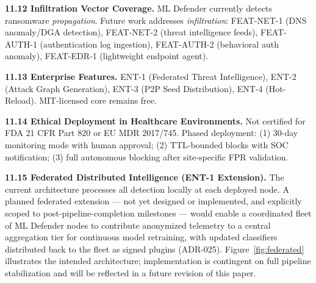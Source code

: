 \documentclass[11pt,a4paper]{article}
\begin{document}
    \textbf{11.12 Infiltration Vector Coverage.}
    ML Defender currently detects ransomware \emph{propagation}. Future work addresses
    \emph{infiltration}: FEAT-NET-1 (DNS anomaly/DGA detection), FEAT-NET-2 (threat intelligence
    feeds), FEAT-AUTH-1 (authentication log ingestion), FEAT-AUTH-2 (behavioral auth anomaly),
    FEAT-EDR-1 (lightweight endpoint agent).

    \textbf{11.13 Enterprise Features.} ENT-1 (Federated Threat Intelligence), ENT-2 (Attack
    Graph Generation), ENT-3 (P2P Seed Distribution), ENT-4 (Hot-Reload). MIT-licensed core
    remains free.

    \textbf{11.14 Ethical Deployment in Healthcare Environments.} Not certified for FDA 21 CFR
    Part 820 or EU MDR 2017/745. Phased deployment: (1) 30-day monitoring mode with human
    approval; (2) TTL-bounded blocks with SOC notification; (3) full autonomous blocking after
    site-specific FPR validation.

    \textbf{11.15 Federated Distributed Intelligence (ENT-1 Extension).}
    \label{sec:future:federated}
    The current architecture processes all detection locally at each deployed node.
    A planned federated extension --- not yet designed or implemented, and explicitly
    scoped to post-pipeline-completion milestones --- would enable a coordinated fleet of
    ML Defender nodes to contribute anonymized telemetry to a central aggregation tier
    for continuous model retraining, with updated classifiers distributed back to the fleet
    as signed plugins (ADR-025). Figure~\ref{fig:federated} illustrates the intended
    architecture; implementation is contingent on full pipeline stabilization and will be
    reflected in a future revision of this paper.
\end{document}
